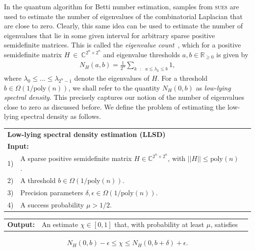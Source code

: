 \documentclass[a4paper, onecolumn, accepted=2022-08-28]{quantumarticle}
\begin{document}
In the quantum algorithm for Betti number estimation, samples from \textsc{sues} are used to estimate the number of eigenvalues of the combinatorial Laplacian that are close to zero.
Clearly, this same idea can be used to estimate the number of eigenvalues that lie in some given interval for arbitrary sparse positive semidefinite matrices.
This is called the \emph{eigenvalue count}~\cite{brandao:thesis}, which for a positive semidefinite matrix $H~\in~\mathbb{C}^{2^n \times 2^n}$ and eigenvalue thresholds $a, b \in \mathbb{R}_{\geq 0}$ is given by
\begin{align*}
  N_H(a, b) = \frac{1}{2^n}\sum_{k\text{ }:\text{ }a \leq \lambda_k\leq b}1,
\end{align*}
where $\lambda_0 \leq \dots \leq \lambda_{2^n-1}$ denote the eigenvalues of $H$.
For a threshold $b \in \Omega\left(1/\mathrm{poly}(n)\right)$, we shall refer to the quantity $N_H(0, b)$ as \emph{low-lying spectral density}.
This precisely captures our notion of the number of eigenvalues close to zero as discussed before.
We define the problem of estimating the low-lying spectral density as follows.

\vspace{3pt}
\noindent\begin{tabularx}{\linewidth}{l X c}
  \multicolumn{2}{l}{\textbf{\textsf{Low-lying spectral density estimation (LLSD)}}\footnotemark[3]} \\
  \multicolumn{2}{l}{\textbf{Input:}}\\
  1) & A sparse positive semidefinite matrix $H \in \mathbb{C}^{2^n \times 2^n}$, with $||H|| \leq \mathrm{poly}(n)$.\\
  2) & A threshold $b \in \Omega\left(1/\mathrm{poly}(n)\right)$.\\
  3) & Precision parameters $\delta, \epsilon \in \Omega\left(1/\mathrm{poly}(n)\right)$.\\
  4) & A success probability $\mu > 1/2$.\\
\end{tabularx}
\noindent\begin{tabularx}{\linewidth}{l X c}
  \textbf{Output:} & An estimate $\chi \in [0,1]$ that, with probability at least $\mu$, satisfies
\end{tabularx}
\vspace{-3pt}
\begin{align*}
    N_H\left(0, b\right) - \epsilon \leq \chi \leq N_H(0, b + \delta) + \epsilon.
\end{align*}
\end{document}
